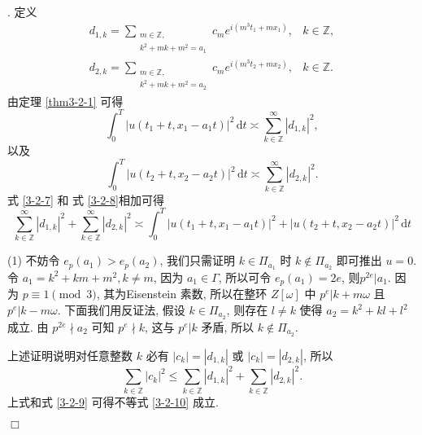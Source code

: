 \documentclass[master]{cugthesis}
\newcommand\Z{\ensuremath{\mathbb{Z}}}
\renewcommand\d{\ensuremath{\,\mathrm{d}}}
\newenvironment{proof}{{\noindent\itshape 证明}.}{\hfill $\Box$\par}
\begin{document}
 \begin{proof}
    定义
    \begin{equation*}
        \begin{array}{ll}
                        d_{1,k}=\sum\limits_{\substack{
                m\in \Z,  \\
                k^2+mk+m^2 = a_1 }} 
             c_me^{i(m^3t_1+mx_1)}, & k\in \Z, \\
                        d_{2,k}=\sum\limits_{\substack{
                m\in \Z,  \\
                k^2+mk+m^2 = a_2 }} 
             c_me^{i(m^3t_2+mx_2)}, & k\in \Z. 
        \end{array}
    \end{equation*}
    由定理 \ref{thm3-2-1} 可得
\begin{equation}\label{3-2-7}
    \int_0^T |u(t_1+t,x_1-a_1t)|^2\d t\asymp \sum_{k\in\Z}^\infty|d_{1,k}|^2,
\end{equation}
以及
\begin{equation}\label{3-2-8}
    \int_0^T |u(t_2+t,x_2-a_2t)|^2\d t\asymp \sum_{k\in\Z}^\infty|d_{2,k}|^2.
\end{equation}
式 \eqref{3-2-7} 和 式 \eqref{3-2-8}相加可得
\begin{equation}\label{3-2-9}
  \sum_{k\in\Z}^\infty|d_{1,k}|^2+\sum_{k\in\Z}^\infty|d_{2,k}|^2\asymp \int_0^T |u(t_1+t,x_1-a_1t)|^2 + |u(t_2+t,x_2-a_2t)|^2\d t
\end{equation}
 
(1) 不妨令 $e_p(a_1)>e_p(a_2)$, 我们只需证明 $k\in \Pi_{a_1}$ 时 $k\notin \Pi_{a_2}$ 即可推出 $u=0$. 令 $a_1=k^2+km+m^2,k\neq m$, 因为 $a_1\in \Gamma$, 所以可令 $e_p(a_1)=2e$, 则$p^{2e} |a_1$. 因为 $p\equiv 1 \pmod{3}$,  其为Eisenstein 素数, 所以在整环 $Z[\omega]$ 中 $p^{e}|k+m\omega$ 且 $p^e | k-m\omega$. 下面我们用反证法, 假设 $k\in \Pi_{a_2}$, 则存在 $l\neq k$ 使得 $a_2=k^2+kl+l^2$ 成立. 由 $p^{2e} \nmid a_2$ 可知 $p^e \nmid k$, 这与 $p^e| k$ 矛盾, 所以 $k\notin \Pi_{a_2}$. 

上述证明说明对任意整数 $k$ 必有 $|c_k|=|d_{1,k}|$ 或 $|c_k|=|d_{2,k}|$, 所以  
  \begin{equation*}
      \sum_{k\in \Z}|c_k|^2\le \sum_{k\in \Z}|d_{1,k}|^2+\sum_{k\in\Z}|d_{2,k}|^2.
  \end{equation*}
  上式和式 \eqref{3-2-9} 可得不等式 \eqref{3-2-10} 成立.


\end{proof}
\end{document}
